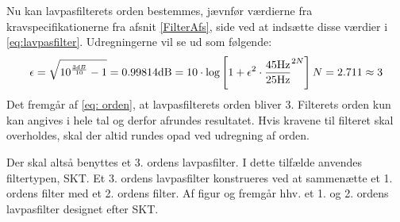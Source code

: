 Nu kan lavpasfilterets orden bestemmes, jævnfør værdierne fra kravspecifikationerne fra afsnit \ref{FilterAfs}, side \pageref{FilterAfs} ved at indsætte disse værdier i \eqref{eq:lavpasfilter}. Udregningerne vil se ud som følgende:
\begin{equation}
\epsilon = \sqrt{10^{\frac{3dB}{10}} - 1} = 0.998 \\ \label{eq:orden}
14\text{dB} = 10 \cdot \text{log} \left[1 + \epsilon ^2 \cdot \frac{45\text{Hz}}{25\text{Hz}}^{2N}\right] \\
N = 2.711 \approx 3
\end{equation}
\noindent Det fremgår af \eqref{eq: orden}, at lavpasfilterets orden bliver $3$. Filterets orden kun kan angives i hele tal og derfor afrundes resultatet. Hvis kravene til filteret skal overholdes, skal der altid rundes opad ved udregning af orden.

Der skal altså benyttes et 3. ordens lavpasfilter. I dette tilfælde anvendes filtertypen, SKT. Et 3. ordens lavpasfilter konstrueres ved at sammenætte et 1. ordens filter med et 2. ordens filter. Af figur  og  fremgår hhv. et 1. og 2. ordens lavpasfilter designet efter SKT. \cite{Carter2013}
	
